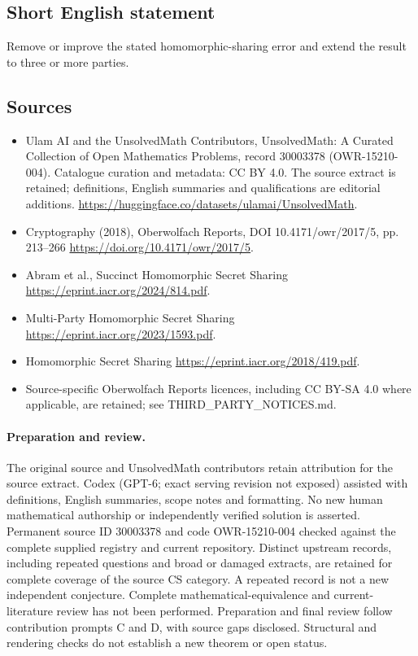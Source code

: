 \documentclass[11pt]{article}
\begin{document}
\subsection{Short English statement}
Remove or improve the stated homomorphic-sharing error and extend the result to three or more parties.
\subsection{Sources}
\begin{itemize}
\item[\hypertarget{source:30003378:1}{S1}] Ulam AI and the UnsolvedMath Contributors, UnsolvedMath: A Curated Collection of Open Mathematics Problems, record 30003378 (OWR-15210-004). Catalogue curation and metadata: CC BY 4.0. The source extract is retained; definitions, English summaries and qualifications are editorial additions.
\url{https://huggingface.co/datasets/ulamai/UnsolvedMath}.
\item[\hypertarget{source:30003378:2}{S2}] Cryptography (2018), Oberwolfach Reports, DOI 10.4171/owr/2017/5, pp. 213--266
\url{https://doi.org/10.4171/owr/2017/5}.
\item[\hypertarget{source:30003378:3}{S3}] Abram et al., Succinct Homomorphic Secret Sharing
\url{https://eprint.iacr.org/2024/814.pdf}.
\item[\hypertarget{source:30003378:4}{S4}] Multi-Party Homomorphic Secret Sharing
\url{https://eprint.iacr.org/2023/1593.pdf}.
\item[\hypertarget{source:30003378:5}{S5}] Homomorphic Secret Sharing
\url{https://eprint.iacr.org/2018/419.pdf}.
\item Source-specific Oberwolfach Reports licences, including CC BY-SA 4.0 where applicable, are retained; see THIRD\_PARTY\_NOTICES.md.
\end{itemize}
\paragraph{Preparation and review.}
The original source and UnsolvedMath contributors retain attribution for the source extract. Codex (GPT-6; exact serving revision not exposed) assisted with definitions, English summaries, scope notes and formatting. No new human mathematical authorship or independently verified solution is asserted. Permanent source ID 30003378 and code OWR-15210-004 checked against the complete supplied registry and current repository. Distinct upstream records, including repeated questions and broad or damaged extracts, are retained for complete coverage of the source CS category. A repeated record is not a new independent conjecture. Complete mathematical-equivalence and current-literature review has not been performed. Preparation and final review follow contribution prompts C and D, with source gaps disclosed. Structural and rendering checks do not establish a new theorem or open status.
\label{end:30003378}
\end{document}
